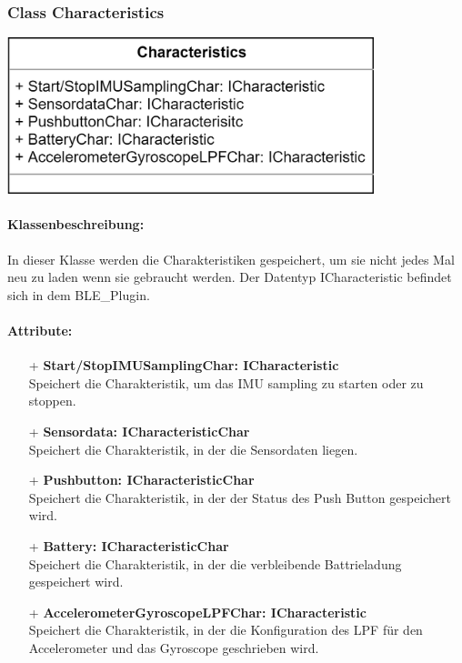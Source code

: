 \documentclass[a4paper,12pt]{article}
\begin{document}
\begin{minipage}[b]{0.5\textwidth}
	\subsubsection{Class Characteristics}
	
	\end{minipage}
	\begin{minipage}[c]{0.5\textwidth}
	\includegraphics[width=0.8\textwidth]{bilder/BibPackageKlassen/Characteristics.png}
\end{minipage}
\paragraph{Klassenbeschreibung:}
In dieser Klasse werden die Charakteristiken gespeichert, um sie nicht jedes Mal neu zu laden wenn sie gebraucht werden. Der Datentyp ICharacteristic befindet sich in dem BLE\_Plugin.

\paragraph{Attribute:}
\begin{itemize}
	\item[+] \textbf{Start/StopIMUSamplingChar: ICharacteristic}\\Speichert die Charakteristik, um das IMU sampling zu starten oder zu stoppen.
	\item[+] \textbf{Sensordata: ICharacteristicChar}\\Speichert die Charakteristik, in der die Sensordaten liegen.
	\item[+] \textbf{Pushbutton: ICharacteristicChar}\\Speichert die Charakteristik, in der der Status des Push Button gespeichert wird.
	\item[+] \textbf{Battery: ICharacteristicChar}\\Speichert die Charakteristik, in der die verbleibende Battrieladung gespeichert wird.
	\item[+] \textbf{AccelerometerGyroscopeLPFChar: ICharacteristic}\\Speichert die Charakteristik, in der die Konfiguration des LPF für den Accelerometer und das Gyroscope geschrieben wird.
\end{itemize}
\end{document}
